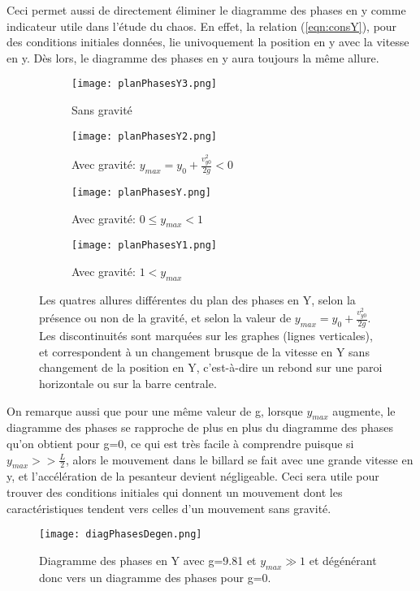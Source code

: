 \documentclass[a4paper]{report}
\begin{document}
Ceci permet aussi de directement éliminer le diagramme des phases en y comme indicateur utile dans l'étude du chaos. En effet, la relation (\ref{eqn:consY}), pour des conditions initiales données, lie univoquement la position en y avec la vitesse en y. Dès lors, le diagramme des phases en y aura toujours la même allure.
\begin{figure}[h!]
        \centering
        \begin{subfigure}[h!]{0.5\textwidth}
                \texttt{[image: planPhasesY3.png]}
                \caption{Sans gravité}
        \end{subfigure}\begin{subfigure}[h!]{0.5\textwidth}
                \texttt{[image: planPhasesY2.png]}
                \caption{Avec gravité: \(y_{max}=y_0 + \frac{v^2_{y0}}{2g} < 0 \) }
        \end{subfigure}

        \begin{subfigure}[h!]{0.5\textwidth}
                \texttt{[image: planPhasesY.png]}
                \caption{Avec gravité: \(0 \leq y_{max} < 1 \)}
        \end{subfigure}\begin{subfigure}[h!]{0.5\textwidth}
                \texttt{[image: planPhasesY1.png]}
                \caption{Avec gravité: \(1<y_{max}\)}
        \end{subfigure}
        \caption[Les quatres allures différentes du plan des phases en Y]{Les quatres allures différentes du plan des phases en Y, selon la présence ou non de la gravité, et selon la valeur de \(y_{max}=y_0 + \frac{v^2_{y0}}{2g}\). Les discontinuités sont marquées sur les graphes (lignes verticales), et correspondent à un changement brusque de la vitesse en Y sans changement de la position en Y, c'est-à-dire un rebond sur une paroi horizontale ou sur la barre centrale.}
\end{figure}

On remarque aussi que pour une même valeur de g, lorsque \(y_{max}\) augmente, le diagramme des phases se rapproche de plus en plus du diagramme des phases qu'on obtient pour g=0, ce qui est très facile à comprendre puisque si \(y_{max}>>\frac{L}{2}\), alors le mouvement dans le billard se fait avec une grande vitesse en y, et l'accélération de la pesanteur devient négligeable. Ceci sera utile pour trouver des conditions initiales qui donnent un mouvement dont les caractéristiques tendent vers celles d'un mouvement sans gravité.
\begin{figure}[h!]
   \texttt{[image: diagPhasesDegen.png]}
      \caption[Diagramme des phases en Y avec g=9,81 dégénérant vers g=0]{Diagramme des phases en Y avec g=9.81 et \(y_{max}\gg 1 \) et dégénérant donc vers un diagramme des phases pour g=0.}
\end{figure}
\end{document}
